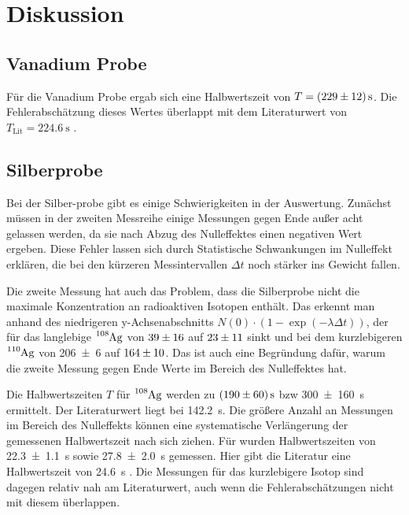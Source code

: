 \section{Diskussion}
\subsection{Vanadium Probe}
Für die Vanadium Probe ergab sich eine Halbwertszeit von $T = \qty{229 \pm 12}{\s}$.
Die Fehlerabschätzung dieses Wertes überlappt mit dem Literaturwert von $T_\text{Lit} = \qty{224.6}{\s}$ \cite{periodensystem}. 

\subsection{Silberprobe}
Bei der Silber-probe gibt es einige Schwierigkeiten in der Auswertung.
Zunächst müssen in der zweiten Messreihe einige Messungen gegen Ende außer acht gelassen werden, da 
sie nach Abzug des Nulleffektes einen negativen Wert ergeben.
Diese Fehler lassen sich durch Statistische Schwankungen im Nulleffekt erklären, 
die bei den kürzeren Messintervallen $\Delta t$ noch stärker ins Gewicht fallen.

Die zweite Messung hat auch das Problem, dass die Silberprobe nicht die maximale Konzentration
an radioaktiven Isotopen enthält.
Das erkennt man anhand des niedrigeren y-Achsenabschnitts $N(0)\cdot (1-\exp(-\lambda \Delta t))$, 
der für das langlebige $\ce{^{108}Ag}$ von $\num{39 \pm 16}$ auf $\num{23 \pm 11}$ sinkt und bei dem 
kurzlebigeren $\ce{^{110}Ag}$ von \num{206 +- 6} auf $\num{164 +- 10}$.
Das ist auch eine Begründung dafür, warum die zweite Messung gegen Ende Werte im Bereich des Nulleffektes hat.

Die Halbwertszeiten $T$ für $\ce{^{108}Ag}$ werden zu $\qty{190 +- 60}{\s}$ bzw \qty{300 +- 160}{\s} ermittelt.
Der Literaturwert \cite{periodensystem} liegt bei \qty{142.2}{\s}. 
Die größere Anzahl an Messungen im Bereich des Nulleffekts können eine systematische Verlängerung der gemessenen
Halbwertszeit nach sich ziehen.
Für  wurden Halbwertszeiten von \qty{22.3 +-1.1}{\s} sowie \qty{27.8 +- 2.0}{\s} gemessen.
Hier gibt die Literatur eine Halbwertszeit von \qty{24.6}{\s} \cite{periodensystem}.
Die Messungen für das kurzlebigere Isotop sind dagegen relativ nah am Literaturwert, auch wenn die
Fehlerabschätzungen nicht mit diesem überlappen.